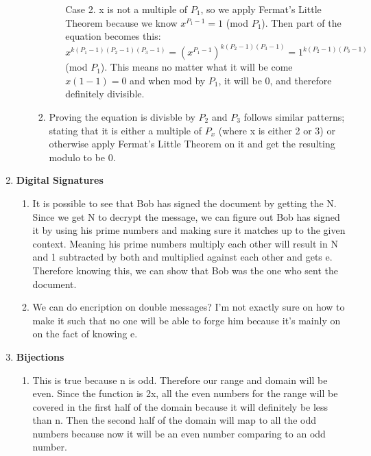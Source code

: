 \documentclass[12pt,fleqn]{article}
\begin{document}
\begin{enumerate}
\begin{enumerate}
\begin{enumerate}
\begin{enumerate}
    			\item[Case 2.] x is not a multiple of $P_1$, so we apply Fermat's Little Theorem because we know $x^{P_1-1} = 1$ (mod $P_1$). Then part of the equation becomes this: $x^{k(P_1-1)(P_2-1)(P_3-1)} = (x^{P_1-1})^{k(P_2-1)(P_3-1)} = 1^{k(P_2-1)(P_3-1)}$ (mod $P_1$). This means no matter what it will be come $x(1 - 1) = 0$ and when mod by $P_1$, it will be 0, and therefore definitely divisible.
    		\end{enumerate}
    		\item Proving the equation is divisble by $P_2$ and $P_3$ follows similar patterns; stating that it is either a multiple of $P_x$ (where x is either 2 or 3) or otherwise apply Fermat's Little Theorem on it and get the resulting modulo to be 0. 
    \end{enumerate}
    
  \end{enumerate}
  
  
  \newpage
  \item \textbf{Digital Signatures}
  \begin{enumerate}
    \item 
    It is possible to see that Bob has signed the document by getting the N. Since we get N to decrypt the message, we can figure out Bob has signed it by using his prime numbers and making sure it matches up to the given context. Meaning his prime numbers multiply each other will result in N and 1 subtracted by both and multiplied against each other and gets e. Therefore knowing this, we can show that Bob was the one who sent the document.
    
    \item 
    We can do encription on double messages? I'm not exactly sure on how to make it such that no one will be able to forge him because it's mainly on on the fact of knowing e. 
    
  \end{enumerate}  
  
  \newpage
  \item \textbf{Bijections}
  \begin{enumerate}
    \item 
    This is true because n is odd. Therefore our range and domain will be even. Since the function is 2x, all the even numbers for the range will be covered in the first half of the domain because it will definitely be less than n. Then the second half of the domain will map to all the odd numbers because now it will be an even number comparing to an odd number. 
    

\end{enumerate}
\end{enumerate}
\end{document}
